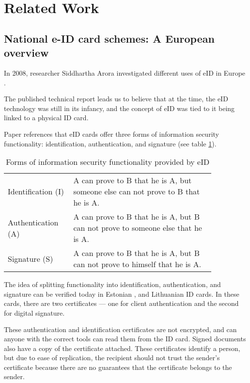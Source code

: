 \section{Related Work}

\subsection{National e-ID card schemes: A European overview}

In 2008, researcher Siddhartha Arora investigated different uses of eID in Europe \cite{ARORA200846}.

The published technical report leads us to believe that at the time, the eID technology was still in its infancy, and the concept of eID was tied to it being linked to a physical ID card.

Paper references that eID cards offer three forms of information security functionality: identification, authentication, and signature (see table \ref{tab:formsofinfosecurity}).

\begin{table}[h]
    \begin{center}
        \caption{Forms of information security functionality provided by eID \cite{ARORA200846, fiat1986prove}}
        \label{tab:formsofinfosecurity}
        \begin{tabular}{p{0.25\linewidth} | p{0.6\linewidth}}
            Identification (I) & A can prove to B that he is A, but someone else can not prove to B that he is A. \\
            Authentication (A) & A can prove to B that he is A, but B can not prove to someone else that he is A. \\
            Signature (S)      & A can prove to B that he is A, but B can not prove to himself that he is A.
        \end{tabular}
    \end{center}
\end{table}

The idea of splitting functionality into identification, authentication, and signature can be verified today in Estonian \cite{ee-id-tech}, and Lithuanian \cite{lt-id-howtouse} ID cards. In these cards, there are two certificates — one for client authentication and the second for digital signature.

These authentication and identification certificates are not encrypted, and can anyone with the correct tools can read them from the ID card. Signed documents also have a copy of the certificate attached. These certificates identify a person, but due to ease of replication, the recipient should not trust the sender's certificate because there are no guarantees that the certificate belongs to the sender. 

